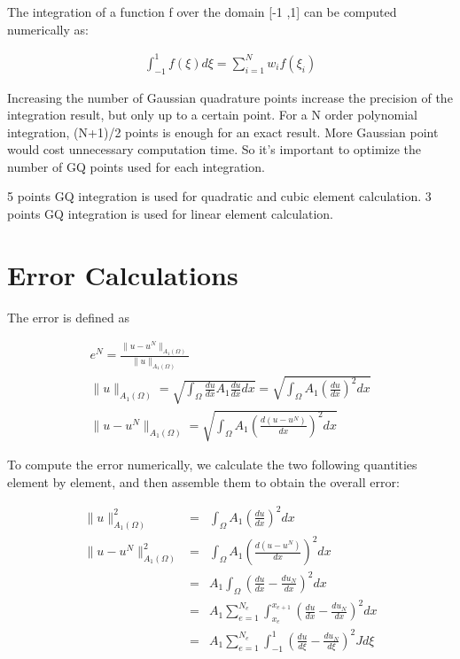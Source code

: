 \documentclass[paper=a4, fontsize=11pt]{article} %
\begin{document}
The integration of a function f over the domain [-1 ,1] can be computed numerically as:

\begin{eqnarray}
\int_{-1}^1 f(\xi) d\xi = \sum_{i=1}^N w_i f(\xi _i)
\end{eqnarray}

Increasing the number of Gaussian quadrature points increase the precision of the integration result, but only up to a certain point. For a N order polynomial integration, (N+1)/2 points is enough for an exact result. More Gaussian point would cost unnecessary computation time. So it's important to optimize the number of GQ points used for each integration. 

5 points GQ integration is used for quadratic and cubic element calculation. 3 points GQ integration is used for linear element calculation.

\section{Error Calculations}
The error is defined as 

\begin{eqnarray}
e^N = \frac{\| u -u^N \| _{A_1(\Omega)}} {\| u \| _{A_1 (\Omega)}} \nonumber\\
\| u \| _{A_1 (\Omega)} = \sqrt{\int_{\Omega} \frac{du}{dx} A_1 \frac{du}{dx} dx} = \sqrt{\int_{\Omega} A_1(\frac{du}{dx})^2 dx}\nonumber\\
\| u -u^N \| _{A_1(\Omega)} = \sqrt{\int_{\Omega} A_1 (\frac{d(u-u^N)}{dx})^2 dx}
\end{eqnarray}

To compute the error numerically, we calculate the two following quantities element by element, and then assemble them to obtain the overall error:

\begin{eqnarray}
\| u \| _{A_1 (\Omega)}^2 &=&\int_{\Omega} A_1(\frac{du}{dx})^2 dx\nonumber\\
\| u -u^N \| _{A_1(\Omega)} ^2 &=& \int_{\Omega} A_1 (\frac{d(u-u^N)}{dx})^2 dx\nonumber\\
&=& A_1 \int_{\Omega} (\frac{du}{dx} - \frac{du_N}{dx})^2 dx\nonumber\\
&=& A_1 \sum_{e=1}^{N_e} \int_{x_e}^{x_{e+1}} (\frac{du}{dx} - \frac{du_N}{dx})^2 dx \nonumber\\
&=& A_1 \sum_{e=1}^{N_e} \int_{-1}^{1} (\frac{du}{d\xi} - \frac{du_N}{d\xi})^2 J d\xi
\end{eqnarray}
\end{document}
